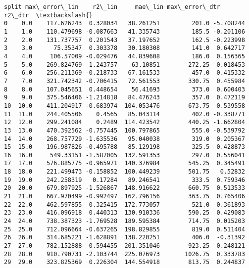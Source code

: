 \documentclass[11pt]{article}
\makeatletter
\newcommand{\boxspacing}{\kern\kvtcb@left@rule\kern\kvtcb@boxsep}
\newcommand{\prompt}[4]{
        {\ttfamily\llap{{\color{#2}[#3]:\hspace{3pt}#4}}\vspace{-\baselineskip}}
    }
\makeatother
\begin{document}
            \begin{tcolorbox}[breakable, size=fbox, boxrule=.5pt, pad at break*=1mm, opacityfill=0]
\prompt{Out}{outcolor}{115}{\boxspacing}
\begin{Verbatim}[commandchars=\\\{\}]
   split max\_error\_lin    r2\_lin     mae\_lin max\_error\_dtr    r2\_dtr  \textbackslash{}
0    0.0    117.626243  0.328034   38.261251         201.0 -5.708244
1    1.0    110.479698 -0.087663   41.335743         185.5 -0.201106
2    2.0    131.737757  0.201543   37.197652         162.5 -0.223998
3    3.0      75.35347  0.303378   30.180308         141.0  0.642717
4    4.0     106.57009 -0.029476   44.839608         186.0  0.156365
5    5.0    269.824769 -1.243757    63.10851        272.25  0.018453
6    6.0    256.211369 -0.218733   67.161533         457.0  0.415332
7    7.0    321.742342 -0.706415   72.561553        330.75  0.455984
8    8.0    107.045651  0.448654    56.41693         373.0  0.600403
9    9.0    375.546406 -1.214818   84.476243         357.0  0.472119
10  10.0    411.204917 -0.683974  104.053476        673.75  0.539558
11  11.0    244.405506    0.4565   85.043114         402.0 -0.338771
12  12.0    299.241084    0.2489  114.423542        440.25 -1.662804
13  13.0    470.392562 -0.757445  100.797865         555.0 -0.539792
14  14.0    268.757729 -1.635536   95.040038         319.0  0.205367
15  15.0    196.987826 -0.495788   85.129198         325.5  0.428873
16  16.0     549.33151 -1.587005  132.591353         297.0  0.556041
17  17.0    576.885775 -0.965971  140.376984        545.25  0.345491
18  18.0    221.499473 -0.158852  100.449239        501.75   0.52832
19  19.0    242.258319   0.17284   89.246541         333.5  0.759346
20  20.0    679.897925 -1.526867  148.916622        660.75  0.513533
21  21.0    667.970499 -0.992497  162.796156        363.75  0.765406
22  22.0    462.597855  0.325415  172.773057         521.0  0.361893
23  23.0    416.096918  0.440313  130.910336        590.25  0.429083
24  24.0    738.387323 -1.769528  189.595384        714.75  0.015203
25  25.0    712.096664 -0.637265  198.829855         819.0  0.511404
26  26.0    314.685221 -1.628891  138.220251         406.0  -0.31392
27  27.0    782.152888 -0.594455  201.351046        923.25  0.248121
28  28.0    910.790731 -2.103744  225.076973       1026.75  0.333783
29  29.0    323.825369  0.226304  144.554918        813.75  0.244837


\end{Verbatim}
\end{tcolorbox}
\end{document}
